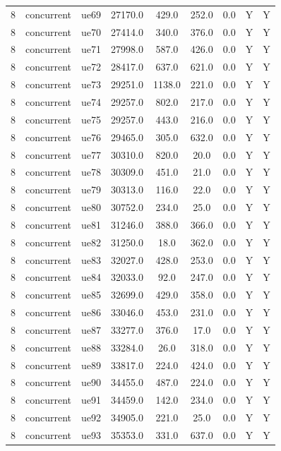 \begin{table}[ht]
\begin{tabular}{|c|c|c|c|c|c|c|c|c|}
8 & concurrent & ue69 & 27170.0 & 429.0 & 252.0 & 0.0 & Y & Y \\
8 & concurrent & ue70 & 27414.0 & 340.0 & 376.0 & 0.0 & Y & Y \\
8 & concurrent & ue71 & 27998.0 & 587.0 & 426.0 & 0.0 & Y & Y \\
8 & concurrent & ue72 & 28417.0 & 637.0 & 621.0 & 0.0 & Y & Y \\
8 & concurrent & ue73 & 29251.0 & 1138.0 & 221.0 & 0.0 & Y & Y \\
8 & concurrent & ue74 & 29257.0 & 802.0 & 217.0 & 0.0 & Y & Y \\
8 & concurrent & ue75 & 29257.0 & 443.0 & 216.0 & 0.0 & Y & Y \\
8 & concurrent & ue76 & 29465.0 & 305.0 & 632.0 & 0.0 & Y & Y \\
8 & concurrent & ue77 & 30310.0 & 820.0 & 20.0 & 0.0 & Y & Y \\
8 & concurrent & ue78 & 30309.0 & 451.0 & 21.0 & 0.0 & Y & Y \\
8 & concurrent & ue79 & 30313.0 & 116.0 & 22.0 & 0.0 & Y & Y \\
8 & concurrent & ue80 & 30752.0 & 234.0 & 25.0 & 0.0 & Y & Y \\
8 & concurrent & ue81 & 31246.0 & 388.0 & 366.0 & 0.0 & Y & Y \\
8 & concurrent & ue82 & 31250.0 & 18.0 & 362.0 & 0.0 & Y & Y \\
8 & concurrent & ue83 & 32027.0 & 428.0 & 253.0 & 0.0 & Y & Y \\
8 & concurrent & ue84 & 32033.0 & 92.0 & 247.0 & 0.0 & Y & Y \\
8 & concurrent & ue85 & 32699.0 & 429.0 & 358.0 & 0.0 & Y & Y \\
8 & concurrent & ue86 & 33046.0 & 453.0 & 231.0 & 0.0 & Y & Y \\
8 & concurrent & ue87 & 33277.0 & 376.0 & 17.0 & 0.0 & Y & Y \\
8 & concurrent & ue88 & 33284.0 & 26.0 & 318.0 & 0.0 & Y & Y \\
8 & concurrent & ue89 & 33817.0 & 224.0 & 424.0 & 0.0 & Y & Y \\
8 & concurrent & ue90 & 34455.0 & 487.0 & 224.0 & 0.0 & Y & Y \\
8 & concurrent & ue91 & 34459.0 & 142.0 & 234.0 & 0.0 & Y & Y \\
8 & concurrent & ue92 & 34905.0 & 221.0 & 25.0 & 0.0 & Y & Y \\
8 & concurrent & ue93 & 35353.0 & 331.0 & 637.0 & 0.0 & Y & Y \\

\end{tabular}
\end{table}
